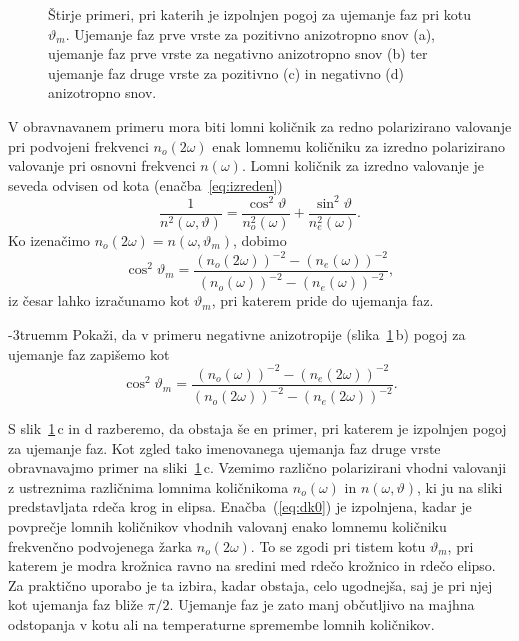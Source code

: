 \begin{figure}[ht]
\centering
\def\svgwidth{145truemm} 

\caption{Štirje primeri, pri katerih je izpolnjen pogoj za ujemanje faz pri kotu $\vartheta_m$. 
Ujemanje faz prve vrste za pozitivno anizotropno snov (a), 
ujemanje faz prve vrste za negativno anizotropno snov (b) ter 
ujemanje faz druge vrste za pozitivno (c) in negativno (d) anizotropno snov.}
\label{fig:dk}
\end{figure}

V obravnavanem primeru mora biti lomni količnik za redno polarizirano valovanje pri 
podvojeni frekvenci $n_o(2\omega)$ enak lomnemu količniku za izredno 
polarizirano valovanje pri osnovni frekvenci $n(\omega)$. Lomni količnik
za izredno valovanje je seveda odvisen od kota (enačba~\ref{eq:izreden})
\begin{equation}
\frac{1}{n^2(\omega,\vartheta)}=
\frac{\cos^{2}\vartheta}{n_{o}^2(\omega)}+\frac{\sin^{2}\vartheta}{n_{e}^2(\omega)}.
\label{8.12}
\end{equation}
Ko izenačimo $n_o(2\omega) = n(\omega,\vartheta_m)$, dobimo
\begin{equation}
\cos^{2}\vartheta_m=\frac{(n_o(2\omega))^{-2}-(n_{e}(\omega))^{-2}}
{(n_{o}(\omega))^{-2}-(n_{e}(\omega))^{-2}},
\label{8.13}
\end{equation}
iz česar lahko izračunamo kot $\vartheta_m$, pri katerem pride do ujemanja faz.
\begin{definition}
\vglue-3truemm
Pokaži, da v primeru negativne anizotropije (slika~\ref{fig:dk}\,b) 
pogoj za ujemanje faz zapišemo kot
\begin{equation}
\cos^{2}\vartheta_m=\frac{(n_o(\omega))^{-2}-(n_{e}(2\omega))^{-2}}
{(n_{o}(2\omega))^{-2}-(n_{e}(2\omega))^{-2}}.
\label{8.13a}
\end{equation}
\end{definition}

S slik~\ref{fig:dk}\,c in d razberemo, da obstaja še en primer, pri 
katerem je izpolnjen pogoj za ujemanje faz. Kot zgled tako imenovanega ujemanja faz druge vrste
obravnavajmo primer na sliki~\ref{fig:dk}\,c.
Vzemimo različno polarizirani vhodni valovanji z ustreznima različnima lomnima
količnikoma $n_o(\omega)$ in $n(\omega,\vartheta)$, ki ju na sliki predstavljata
rdeča krog in elipsa.
Enačba~(\ref{eq:dk0}) je izpolnjena, kadar je povprečje lomnih količnikov
vhodnih valovanj  enako lomnemu količniku frekvenčno podvojenega žarka $n_o(2\omega)$. 
To se zgodi pri tistem kotu $\vartheta_m$, pri katerem je modra krožnica ravno na 
sredini med rdečo krožnico in rdečo elipso. Za praktično uporabo je ta izbira, kadar obstaja,
celo ugodnejša, saj je pri njej kot ujemanja faz bliže $\pi/2$. 
Ujemanje faz je zato manj občutljivo na majhna odstopanja v kotu ali na temperaturne
spremembe lomnih količnikov. 

